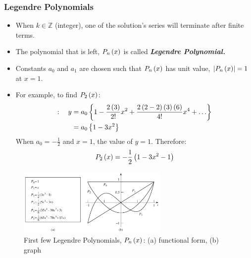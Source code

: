 \subsubsection{Legendre Polynomials}
\begin{itemize}[\tiny$\bullet$]
    \item When $k\in\mathbb{Z}$ (integer), one of the solution's series will terminate after finite terms.
    \item The polynomial that is left, $P_n\left(x\right)$ is called \textbf{\textit{Legendre Polynomial.}}
    \item Constants $a_0$ and $a_1$ are chosen such that $P_n\left(x\right)$ has unit value, $\left|P_n\left(x\right)\right|=1$ at $x=1$.
    \item For example, to find $P_2\left(x\right)$:
    \begin{align*}
        [c=0]:\quad y&=a_0\cbracket{1-\frac{2\bracket{3}}{2!}x^2+\frac{2\bracket{2-2}\bracket{3}\bracket{6}}{4!}x^4+\ldots}\\
        &=a_0\cbracket{1-3x^2}
    \end{align*}
    When $a_0=-\frac{1}{2}$ and $x=1$, the value of $y=1$. Therefore:
    \begin{equation*}
        P_2\left(x\right)=-\frac{1}{2}\left(1-3x^2-1\right)
    \end{equation*}
\end{itemize}\vspace{-3ex}
\begin{figure}[!ht]
    \centering
    \includegraphics[width=0.65\textwidth]{Images/4.2.png}
    \caption{First few Legendre Polynomials, $P_n\left(x\right)$: (a) functional form, (b) graph }
    \label{fig:4.2}
\end{figure}
\newpage
